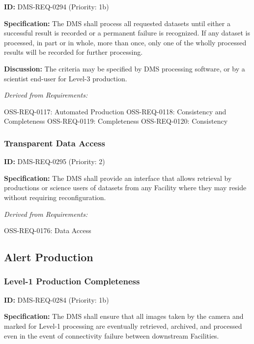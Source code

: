 \documentclass[SE,toc,lsstdraft]{lsstdoc}
\begin{document}
\label{DMS-REQ-0294}
\textbf{ID:} DMS-REQ-0294 (Priority: 1b)

\textbf{Specification:} The DMS shall process all requested datasets until either a successful result is recorded or a permanent failure is recognized. If any dataset is processed, in part or in whole, more than once, only one of the wholly processed results will be recorded for further processing.

\textbf{Discussion: }The criteria may be specified by DMS processing software, or by a scientist end-user for Level-3 production.

\emph{Derived from Requirements:}

OSS-REQ-0117:
Automated Production \newline
OSS-REQ-0118:
Consistency and Completeness \newline
OSS-REQ-0119:
Completeness \newline
OSS-REQ-0120:
Consistency \newline

\subsubsection{Transparent Data Access}

\label{DMS-REQ-0295}
\textbf{ID:} DMS-REQ-0295 (Priority: 2)

\textbf{Specification:} The DMS shall provide an interface that allows retrieval by productions or science users of datasets from any Facility where they may reside without requiring reconfiguration.

\emph{Derived from Requirements:}

OSS-REQ-0176:
Data Access \newline

\subsection{Alert Production}

\subsubsection{Level-1 Production Completeness}

\label{DMS-REQ-0284}
\textbf{ID:} DMS-REQ-0284 (Priority: 1b)

\textbf{Specification:} The DMS shall ensure that all images taken by the camera and marked for Level-1 processing are eventually retrieved, archived, and processed even in the event of connectivity failure between downstream Facilities.
\end{document}
